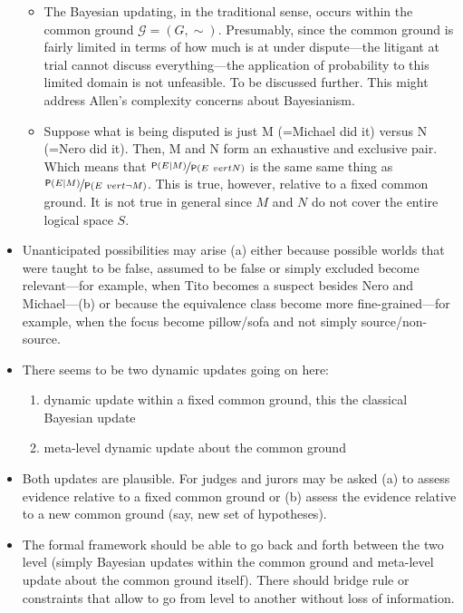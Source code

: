 \documentclass[
  11pt,
  dvipsnames,enabledeprecatedfontcommands]{scrartcl}
\providecommand{\tightlist}{%
  \setlength{\itemsep}{0pt}\setlength{\parskip}{0pt}}
\newcommand{\pr}[1]{\ensuremath{\mathsf{P}(#1)}}
\begin{document}
\begin{itemize}
  \begin{itemize}
  \item
    The Bayesian updating, in the traditional sense, occurs within the
    common ground \(\mathcal{G}=(G, \sim)\). Presumably, since the
    common ground is fairly limited in terms of how much is at under
    dispute---the litigant at trial cannot discuss everything---the
    application of probability to this limited domain is not unfeasible.
    To be discussed further. This might address Allen's complexity
    concerns about Bayesianism.
  \item
    Suppose what is being disputed is just M (=Michael did it) versus N
    (=Nero did it). Then, M and N form an exhaustive and exclusive pair.
    Which means that \(\nicefrac{\pr{E \vert M}}{\pr{E \ vert N}}\) is
    the same same thing as
    \(\nicefrac{\pr{E \vert M}}{\pr{E \ vert \neg M}}\). This is true,
    however, relative to a fixed common ground. It is not true in
    general since \(M\) and \(N\) do not cover the entire logical space
    \(S\).
  \end{itemize}
\item
  Unanticipated possibilities may arise (a) either because possible
  worlds that were taught to be false, assumed to be false or simply
  excluded become relevant---for example, when Tito becomes a suspect
  besides Nero and Michael---(b) or because the equivalence class become
  more fine-grained---for example, when the focus become pillow/sofa and
  not simply source/non-source.
\item
  There seems to be two dynamic updates going on here:

  \begin{enumerate}
  \def\labelenumi{\alph{enumi}.}
  \tightlist
  \item
    dynamic update within a fixed common ground, this the classical
    Bayesian update
  \item
    meta-level dynamic update about the common ground
  \end{enumerate}
\item
  Both updates are plausible. For judges and jurors may be asked (a) to
  assess evidence relative to a fixed common ground or (b) assess the
  evidence relative to a new common ground (say, new set of hypotheses).
\item
  The formal framework should be able to go back and forth between the
  two level (simply Bayesian updates within the common ground and
  meta-level update about the common ground itself). There should bridge
  rule or constraints that allow to go from level to another without
  loss of information.


\end{itemize}
\end{document}
